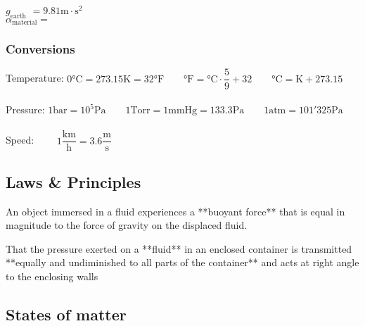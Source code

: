 $g_\text{earth}$ $= 9.81 \text{m}\cdot\text{s}^\text{2}$ \\
$\alpha_\text{material} = $

\subsubsection{Conversions}

Temperature: \qquad $0\text{°C} = 273.15\text{K}=32\text{°F} \qquad \text{°F} = \text{°C} \cdot \dfrac{5}{9} + 32 \qquad \text{°C} = \text{K} + 273.15$
\\\\
Pressure: \qquad
  $1\text{bar} = 10^5\text{Pa} \qquad 
   1\text{Torr} = 1\text{mmHg} = 133.3\text{Pa} \qquad
   1\text{atm} = 101'325\text{Pa}$
\\\\
Speed: $\qquad 1\dfrac{\text{km}}{\text{h}}     = 3.6\dfrac{\text{m}}{\text{s}}$

\subsection{Laws \& Principles}

An object immersed in a fluid experiences a **buoyant force** that is equal in magnitude to the force of gravity on the displaced fluid.

That the pressure exerted on a **fluid** in an enclosed container is transmitted **equally and undiminished to all parts of the container** and acts at right angle to the enclosing walls


\subsection{States of matter}